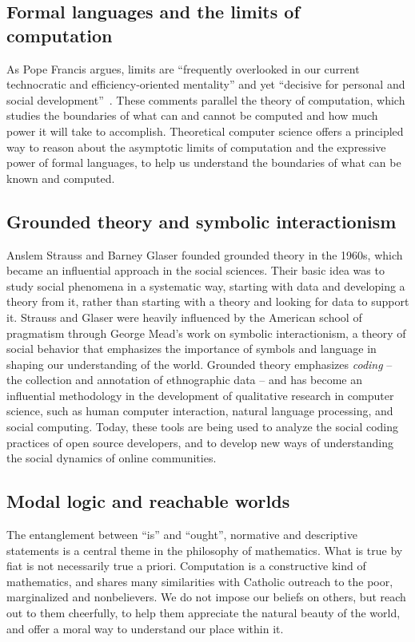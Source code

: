 \documentclass[sigplan,nonacm]{acmart}\settopmatter{printfolios=false,printccs=false,printacmref=false}
\begin{document}
\subsection{Formal languages and the limits of computation}

As Pope Francis argues, limits are ``frequently overlooked in our current technocratic and efficiency-oriented mentality'' and yet ``decisive for personal and social development''~\cite{catholic2024message}. These comments parallel the theory of computation, which studies the boundaries of what can and cannot be computed and how much power it will take to accomplish. Theoretical computer science offers a principled way to reason about the asymptotic limits of computation and the expressive power of formal languages, to help us understand the boundaries of what can be known and computed.

\subsection{Grounded theory and symbolic interactionism}

Anslem Strauss and Barney Glaser founded grounded theory in the 1960s, which became an influential approach in the social sciences. Their basic idea was to study social phenomena in a systematic way, starting with data and developing a theory from it, rather than starting with a theory and looking for data to support it. Strauss and Glaser were heavily influenced by the American school of pragmatism through George Mead's work on symbolic interactionism, a theory of social behavior that emphasizes the importance of symbols and language in shaping our understanding of the world. Grounded theory emphasizes \textit{coding} -- the collection and annotation of ethnographic data -- and has become an influential methodology in the development of qualitative research in computer science, such as human computer interaction, natural language processing, and social computing. Today, these tools are being used to analyze the social coding practices of open source developers, and to develop new ways of understanding the social dynamics of online communities.

\subsection{Modal logic and reachable worlds}

The entanglement between ``is'' and ``ought'', normative and descriptive statements is a central theme in the philosophy of mathematics. What is true by fiat is not necessarily true a priori. Computation is a constructive kind of mathematics, and shares many similarities with Catholic outreach to the poor, marginalized and nonbelievers. We do not impose our beliefs on others, but reach out to them cheerfully, to help them appreciate the natural beauty of the world, and offer a moral way to understand our place within it.
\end{document}
